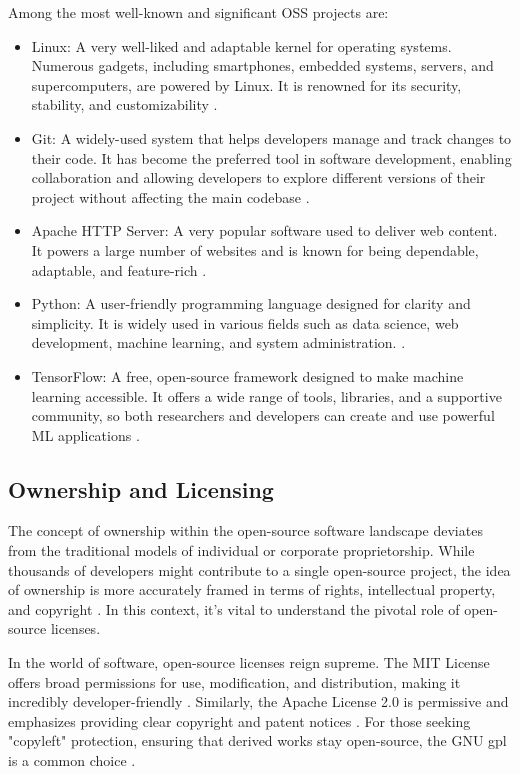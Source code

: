 Among the most well-known and significant OSS projects are:
\begin{itemize}
    \item Linux: A very well-liked and adaptable kernel for operating systems. Numerous gadgets, including smartphones, embedded systems, servers, and supercomputers, are powered by Linux. It is renowned for its security, stability, and customizability \cite{fink2003business}.
    \item Git: A widely-used system that helps developers manage and track changes to their code. It has become the preferred tool in software development, enabling collaboration and allowing developers to explore different versions of their project without affecting the main codebase \cite{loeliger2012version}.
    \item Apache HTTP Server: A very popular software used to deliver web content. It powers a large number of websites and is known for being dependable, adaptable, and feature-rich \cite{fielding1997apache}.
    \item  Python: A user-friendly programming language designed for clarity and simplicity. It is widely used in various fields such as data science, web development, machine learning, and system administration. \cite{srinath2017python}.
    \item TensorFlow: A free, open-source framework designed to make machine learning accessible. It offers a wide range of tools, libraries, and a supportive community, so both researchers and developers can create and use powerful ML applications \cite{developers2022tensorflow}.
\end{itemize}

\subsection{Ownership and Licensing}

The concept of ownership within the open-source software landscape deviates from the traditional models of individual or corporate proprietorship. While thousands of developers might contribute to a single open-source project, the idea of ownership is more accurately framed in terms of rights, intellectual property, and copyright \cite{Codeownership}.  In this context, it's vital to understand the pivotal role of open-source licenses.

In the world of software, open-source licenses reign supreme. The MIT License offers broad permissions for use, modification, and distribution, making it incredibly developer-friendly \cite{saltzer2020origin}. Similarly, the Apache License 2.0 is permissive and emphasizes providing clear copyright and patent notices \cite{sinclair2010license}. For those seeking "copyleft" protection, ensuring that derived works stay open-source, the GNU \ac{gpl} is a common choice \cite{license1989gnu}.

